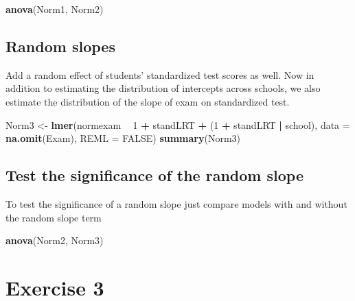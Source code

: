 \documentclass[]{book}
\newenvironment{Shaded}{\begin{snugshade}}{\end{snugshade}}
\newcommand{\KeywordTok}[1]{\textcolor[rgb]{0.13,0.29,0.53}{\textbf{#1}}}
\newcommand{\DataTypeTok}[1]{\textcolor[rgb]{0.13,0.29,0.53}{#1}}
\newcommand{\DecValTok}[1]{\textcolor[rgb]{0.00,0.00,0.81}{#1}}
\newcommand{\StringTok}[1]{\textcolor[rgb]{0.31,0.60,0.02}{#1}}
\newcommand{\OtherTok}[1]{\textcolor[rgb]{0.56,0.35,0.01}{#1}}
\newcommand{\OperatorTok}[1]{\textcolor[rgb]{0.81,0.36,0.00}{\textbf{#1}}}
\newcommand{\NormalTok}[1]{#1}
\begin{document}
\begin{Shaded}
\begin{Highlighting}[]
  \KeywordTok{anova}\NormalTok{(Norm1, Norm2)}
\end{Highlighting}
\end{Shaded}

\subsection{Random slopes}\label{random-slopes}

Add a random effect of students' standardized test scores as well. Now
in addition to estimating the distribution of intercepts across schools,
we also estimate the distribution of the slope of exam on standardized
test.

\begin{Shaded}
\begin{Highlighting}[]
\NormalTok{  Norm3 <-}\StringTok{ }\KeywordTok{lmer}\NormalTok{(normexam }\OperatorTok{~}\StringTok{ }\DecValTok{1} \OperatorTok{+}\StringTok{ }\NormalTok{standLRT }\OperatorTok{+}\StringTok{ }\NormalTok{(}\DecValTok{1} \OperatorTok{+}\StringTok{ }\NormalTok{standLRT }\OperatorTok{|}\StringTok{ }\NormalTok{school), }
                \DataTypeTok{data =} \KeywordTok{na.omit}\NormalTok{(Exam), }\DataTypeTok{REML =} \OtherTok{FALSE}\NormalTok{) }
  \KeywordTok{summary}\NormalTok{(Norm3) }
\end{Highlighting}
\end{Shaded}

\subsection{Test the significance of the random
slope}\label{test-the-significance-of-the-random-slope}

To test the significance of a random slope just compare models with and
without the random slope term

\begin{Shaded}
\begin{Highlighting}[]
  \KeywordTok{anova}\NormalTok{(Norm2, Norm3) }
\end{Highlighting}
\end{Shaded}

\section{Exercise 3}\label{exercise-3-1}
\end{document}
